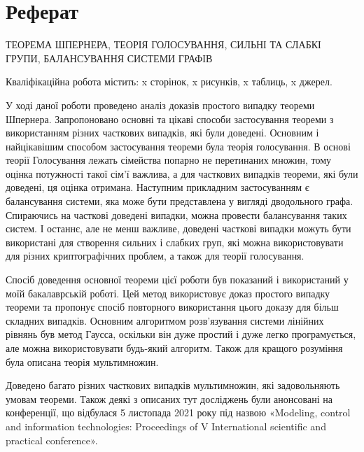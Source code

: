 \chapter*{Реферат}

\MakeUppercase{Теорема Шпернера, теорія голосування, сильні та слабкі групи, балансування системи графів}

Кваліфікаційна робота містить: x сторінок, x рисунків, x таблиць, x джерел.

У ході даної роботи проведено аналіз доказів простого випадку теореми Шпернера. Запропоновано основні та цікаві способи застосування теореми з використанням різних часткових випадків, які були доведені. Основним і найцікавішим способом застосування теореми була теорія голосування. В основі теорії Голосування лежать сімейства попарно не перетинаних множин, тому оцінка потужності такої сім'ї важлива, а для часткових випадків теореми, які були доведені, ця оцінка отримана. Наступним прикладним застосуванням є балансування системи, яка може бути представлена ​​у вигляді дводольного графа. Спираючись на часткові доведені випадки, можна провести балансування таких систем. І останнє, але не менш важливе, доведені часткові випадки можуть бути використані для створення сильних і слабких груп, які можна використовувати для різних криптографічних проблем, а також для теорії голосування.

Спосіб доведення основної теореми цієї роботи був показаний і використаний у моїй бакалаврській роботі. Цей метод використовує доказ простого випадку теореми та пропонує спосіб повторного використання цього доказу для більш складних випадків. Основним алгоритмом розв’язування системи лінійних рівнянь був метод Гаусса, оскільки він дуже простий і дуже легко програмується, але можна використовувати будь-який алгоритм. Також для кращого розуміння була описана теорія мультимножин.

Доведено багато різних часткових випадків мультимножин, які задовольняють умовам теореми. Також деякі з описаних тут досліджень були анонсовані на конференції, що відбулася 5 листопада 2021 року під назвою «Modeling, control and information technologies: Proceedings of V International scientific and practical conference».